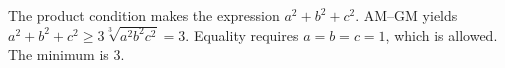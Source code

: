 The product condition makes the expression $a^2+b^2+c^2$. AM--GM yields $a^2+b^2+c^2\ge3\sqrt[3]{a^2b^2c^2}=3$. Equality requires $a=b=c=1$, which is allowed. The minimum is $\boxed3$.
